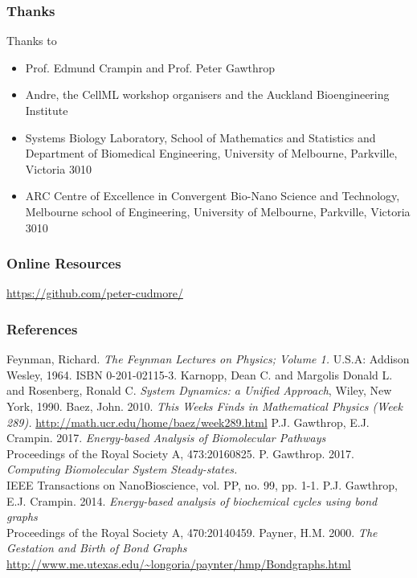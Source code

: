 \begin{frame}
\frametitle{Thanks}
{\small
Thanks to
\begin{itemize}
		\itemsep1em
	\item Prof. Edmund Crampin and Prof. Peter Gawthrop
	\item Andre, the CellML workshop organisers and the Auckland Bioengineering Institute
\item Systems Biology Laboratory, School of Mathematics and Statistics and Department of Biomedical Engineering, University of Melbourne, Parkville, Victoria 3010
\item ARC Centre of Excellence in Convergent Bio-Nano Science and Technology,
Melbourne school of Engineering, 
University of Melbourne, Parkville, Victoria 3010
\end{itemize}
}
\end{frame}
\begin{frame}
\frametitle{Online Resources}
\url{https://github.com/peter-cudmore/}
\end{frame}
\begin{frame}
\frametitle{References}
{\tiny
	\begin{thebibliography}{6}
		 Feynman, Richard. \emph{The Feynman Lectures on Physics; Volume 1.} U.S.A: Addison Wesley, 1964. ISBN 0-201-02115-3.
		 Karnopp, Dean C. and Margolis Donald L. and Rosenberg, Ronald C. \emph{System Dynamics: a Unified Approach}, Wiley, New York, 1990.
		 Baez, John. 2010. \emph{This Weeks Finds in Mathematical Physics (Week 289).} \url{http://math.ucr.edu/home/baez/week289.html}
		  P.J. Gawthrop, E.J. Crampin. 2017. \emph{Energy-based Analysis of Biomolecular Pathways}\\
		Proceedings of the Royal Society A, 473:20160825.
		 P. Gawthrop. 2017. \emph{Computing Biomolecular System Steady-states.}\\
		IEEE Transactions on NanoBioscience, vol. PP, no. 99, pp. 1-1. 
		 P.J. Gawthrop, E.J. Crampin. 2014. \emph{Energy-based analysis of biochemical cycles using bond graphs}\\
		Proceedings of the Royal Society A, 470:20140459.
		 Payner, H.M. 2000. \emph{The Gestation and Birth of Bond Graphs} \url{http://www.me.utexas.edu/\~longoria/paynter/hmp/Bondgraphs.html}
\end{thebibliography}}
\end{frame}
